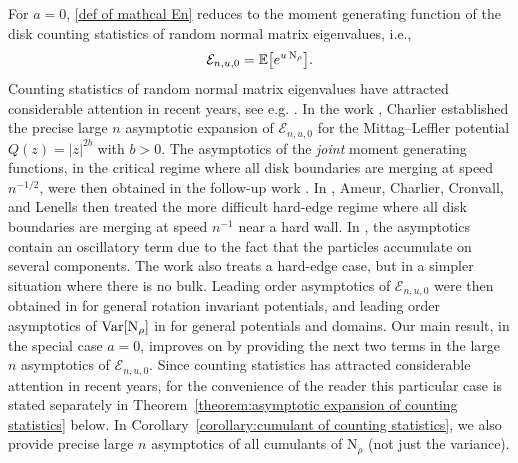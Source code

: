 \documentclass[reqno]{amsart}
\newcommand{\1}{\mathds{1}}
\numberwithin{equation}{section}
\theoremstyle{definition}
\begin{document}
For $a=0$, \eqref{def of mathcal En} reduces to the moment generating function of the disk counting statistics of random normal matrix eigenvalues, i.e.,
\begin{equation}
\label{def of disk counting statistics}
    \mathcal{E}_{n,u,0}=\mathbb{E}\bigl[e^{u\,{\rm N}_{\rho}}\bigr].
\end{equation}
Counting statistics of random normal matrix eigenvalues have attracted considerable attention in recent years, see e.g. \cite{ABE2023,ABES2023,LeeRiser2016,LMS2018,L et al 2019,FenzlLambert,SDMS2020,SDMS2021,ADM24,C2021 FH,ACCL1,ACCL2,CL2023}. 
In the work \cite{C2021 FH}, Charlier established the precise large $n$ asymptotic expansion of $\mathcal{E}_{n,u,0}$ for the Mittag–Leffler potential $Q(z)=|z|^{2b}$ with $b>0$. The asymptotics of the \textit{joint} moment generating functions, in the critical regime where all disk boundaries are merging at speed $n^{-1/2}$, were then obtained in the follow-up work \cite{CL2023}. In \cite{ACCL1,ACCL2}, Ameur, Charlier, Cronvall, and Lenells then treated the more difficult hard-edge regime where all disk boundaries are merging at speed $n^{-1}$ near a hard wall. In \cite{ACCL2}, the asymptotics contain an oscillatory term due to the fact that the particles accumulate on several components. The work \cite{ACM2024} also treats a hard-edge case, but in a simpler situation where there is no bulk. Leading order asymptotics of $\mathcal{E}_{n,u,0}$ were then obtained in \cite{ABES2023} for general rotation invariant potentials, and leading order asymptotics of $\mathrm{Var}[{\rm N}_{\rho}]$ in \cite{MMO25} for general potentials and domains. Our main result, in the special case $a=0$, improves on \cite{ABES2023} by providing the next two terms in the large $n$ asymptotics of $\mathcal{E}_{n,u,0}$. Since counting statistics has attracted considerable attention in recent years, for the convenience of the reader this particular case is stated separately in Theorem~\ref{theorem:asymptotic expansion of counting statistics} below. In Corollary~\ref{corollary:cumulant of counting statistics}, we also provide precise large $n$ asymptotics of all cumulants of $\mathrm{N}_{\rho}$ (not just the variance).
\end{document}
